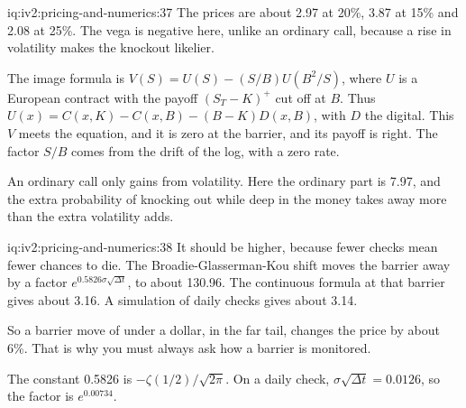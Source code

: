 \begin{solution}{iq:iv2:pricing-and-numerics:37}
The prices are about 2.97 at 20\%, 3.87 at 15\% and 2.08 at 25\%. The vega is negative here, unlike an ordinary call, because a rise in volatility makes the knockout likelier.

The image formula is $V(S) = U(S) - (S/B)U(B^2/S)$, where $U$ is a European contract with the payoff $(S_T - K)^+$ cut off at $B$. Thus $U(x) = C(x, K) - C(x, B) - (B - K)D(x, B)$, with $D$ the digital. This $V$ meets the equation, and it is zero at the barrier, and its payoff is right. The factor $S/B$ comes from the drift of the log, with a zero rate.

An ordinary call only gains from volatility. Here the ordinary part is 7.97, and the extra probability of knocking out while deep in the money takes away more than the extra volatility adds.

\end{solution}

\begin{solution}{iq:iv2:pricing-and-numerics:38}
It should be higher, because fewer checks mean fewer chances to die. The Broadie-Glasserman-Kou shift moves the barrier away by a factor $e^{0.5826\sigma\sqrt{\Delta t}}$, to about 130.96. The continuous formula at that barrier gives about 3.16. A simulation of daily checks gives about 3.14.

So a barrier move of under a dollar, in the far tail, changes the price by about 6\%. That is why you must always ask how a barrier is monitored.

The constant 0.5826 is $-\zeta(1/2)/\sqrt{2\pi}$. On a daily check, $\sigma\sqrt{\Delta t} = 0.0126$, so the factor is $e^{0.00734}$.

\end{solution}

